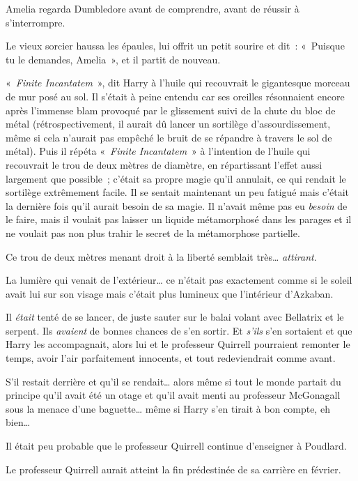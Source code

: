 Amelia regarda Dumbledore avant de comprendre, avant de réussir à s'interrompre.

Le vieux sorcier haussa les épaules, lui offrit un petit sourire et dit~: «~Puisque tu le demandes, Amelia~», et il partit de nouveau.

\later

«~\emph{Finite Incantatem}~», dit Harry à l'huile qui recouvrait le gigantesque morceau de mur posé au sol. Il s'était à peine entendu car ses oreilles résonnaient encore après l'immense blam provoqué par le glissement suivi de la chute du bloc de métal (rétrospectivement, il aurait dû lancer un sortilège d'assourdissement, même si cela n'aurait pas empêché le bruit de se répandre à travers le sol de métal). Puis il répéta «~\emph{Finite Incantatem}~» à l'intention de l'huile qui recouvrait le trou de deux mètres de diamètre, en répartissant l'effet aussi largement que possible~; c'était sa propre magie qu'il annulait, ce qui rendait le sortilège extrêmement facile. Il se sentait maintenant un peu fatigué mais c'était la dernière fois qu'il aurait besoin de sa magie. Il n'avait même pas eu \emph{besoin} de le faire, mais il voulait pas laisser un liquide métamorphosé dans les parages et il ne voulait pas non plus trahir le secret de la métamorphose partielle.

Ce trou de deux mètres menant droit à la liberté semblait très… \emph{attirant}.

La lumière qui venait de l'extérieur… ce n'était pas exactement comme si le soleil avait lui sur son visage mais c'était plus lumineux que l'intérieur d'Azkaban.

Il \emph{était} tenté de se lancer, de juste sauter sur le balai volant avec Bellatrix et le serpent. Ils \emph{avaient} de bonnes chances de s'en sortir. Et \emph{s'ils} s'en sortaient et que Harry les accompagnait, alors lui et le professeur Quirrell pourraient remonter le temps, avoir l'air parfaitement innocents, et tout redeviendrait comme avant.

S'il restait derrière et qu'il se rendait… alors même si tout le monde partait du principe qu'il avait été un otage et qu'il avait menti au professeur McGonagall sous la menace d'une baguette… même si Harry s'en tirait à bon compte, eh bien…

Il était peu probable que le professeur Quirrell continue d'enseigner à Poudlard.

Le professeur Quirrell aurait atteint la fin prédestinée de sa carrière en février.

